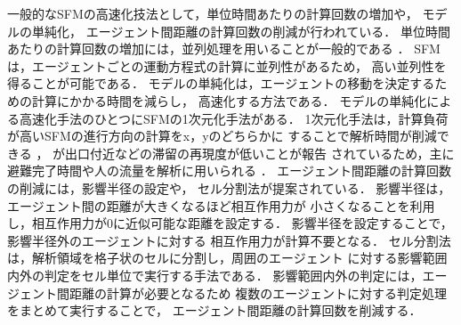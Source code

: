 一般的なSFMの高速化技法として，単位時間あたりの計算回数の増加や，
モデルの単純化，
エージェント間距離の計算回数の削減が行われている．
単位時間あたりの計算回数の増加には，並列処理を用いることが一般的である
\cite{seru_sfm1}\cite{seru_sfm2}
\cite{sfm_gpu1}\cite{sfm_gpu2}\cite{sfm_gpu3}\cite{sfm_gpu4}．
SFMは，エージェントごとの運動方程式の計算に並列性があるため，
高い並列性を得ることが可能である\cite{mpi1}\cite{mpi2}．
モデルの単純化は，エージェントの移動を決定するための計算にかかる時間を減らし，
高速化する方法である．
モデルの単純化による高速化手法のひとつにSFMの1次元化手法がある．
1次元化手法は，計算負荷が高いSFMの進行方向の計算をx，yのどちらかに
することで解析時間が削減できる
\cite{1jigen_model}\cite{1jigen_model1}\cite{1jigen_model2}，
が出口付近などの滞留の再現度が低いことが報告
されているため，主に避難完了時間や人の流量を解析に用いられる
\cite{1jigen_katuyou}\cite{1jigen_model_ev1}\cite{1jigen_model_ev2}．
エージェント間距離の計算回数の削減には，影響半径の設定や，
セル分割法が提案されている\cite{cell1}\cite{cell2}．
影響半径は，エージェント間の距離が大きくなるほど相互作用力が
小さくなることを利用し，相互作用力が0に近似可能な距離を設定する．
影響半径を設定することで，影響半径外のエージェントに対する
相互作用力が計算不要となる\cite{eikyo_space}．
セル分割法は，解析領域を格子状のセルに分割し，周囲のエージェント
に対する影響範囲内外の判定をセル単位で実行する手法である．
影響範囲内外の判定には，エージェント間距離の計算が必要となるため
複数のエージェントに対する判定処理をまとめて実行することで，
エージェント間距離の計算回数を削減する．

